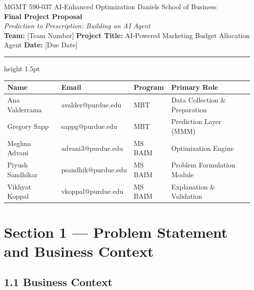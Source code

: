 \documentclass[11pt]{article}
\begin{document}
\begin{center}
  {\small\color{navyblue}
    MGMT 590-037 \;\textperiodcentered\; AI-Enhanced Optimization \;\textperiodcentered\; Daniels School of Business}\\[5pt]
  {\LARGE\bfseries\color{navyblue} Final Project Proposal}\\[4pt]
  {\large\itshape Prediction to Prescription: Building an AI Agent}\\[5pt]
  {\small
    \textbf{Team:} [Team Number] \quad
    \textbf{Project Title:} AI-Powered Marketing Budget Allocation Agent \quad
    \textbf{Date:} [Due Date]}
\end{center}

\vspace{4pt}\hrule height 1.5pt\vspace{10pt}

\begin{center}
\small
\begin{tabular}{llll}
\toprule
\textbf{Name} & \textbf{Email} & \textbf{Program} & \textbf{Primary Role} \\
\midrule
Ana Valderrama   & avalder@purdue.edu & MBT & Data Collection \& Preparation \\
Gregory Sapp     & sappg@purdue.edu & MBT & Prediction Layer (MMM) \\
Meghna Advani    & advani3@purdue.edu & MS BAIM & Optimization Engine \\
Piyush Sandhikar & psandhik@purdue.edu & MS BAIM & Problem Formulation Module \\
Vikhyat Koppal   & vkoppal@purdue.edu & MS BAIM & Explanation \& Validation \\
\bottomrule
\end{tabular}
\end{center}

\vspace{6pt}

\section{Section 1 --- Problem Statement and Business Context}

\subsection*{1.1 \; Business Context}
\end{document}
